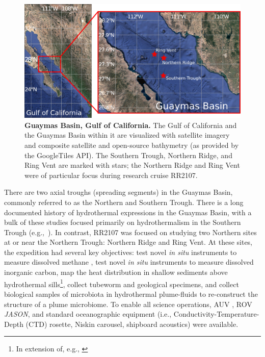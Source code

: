 \begin{figure}[!ht]
  \centering
  \includegraphics[width=\columnwidth]{figures/ops_guaymas.png}
  \caption[Guaymas Basin, Gulf of California.]{\textbf{Guaymas Basin, Gulf of California.} The Gulf of California and the Guaymas Basin within it are visualized with satellite imagery and composite satellite and open-source bathymetry (as provided by the GoogleTiles API). The Southern Trough, Northern Ridge, and Ring Vent are marked with stars; the Northern Ridge and Ring Vent were of particular focus during research cruise RR2107.}
  \label{fig:ops_map}
\end{figure}

There are two axial troughs (spreading segments) in the Guaymas Basin, commonly referred to as the Northern and Southern Trough. There is a long documented history of hydrothermal expressions in the Guaymas Basin, with a bulk of these studies focused primarily on hydrothermalism in the Southern Trough (e.g.,~\cite{ondreas2018recent, teske2016guaymas, seewald1994variations, von1985chemistry, lonsdale1985hydrothermal}). In contrast, RR2107 was focused on studying two Northern sites at or near the Northern Trough: Northern Ridge and Ring Vent. At these sites, the expedition had several key objectives: test novel \emph{in situ} instruments to measure dissolved methane \autocite{kapit2021dissolved,kapit2021measurement,michel2022gas}, test novel \emph{in situ} instruments to measure dissolved inorganic carbon, map the heat distribution in shallow sediments above hydrothermal sills\footnote{In extension of, e.g., \cite{neumann2022heat}}, collect tubeworm and geological specimens, and collect biological samples of microbiota in hydrothermal plume-fluids to re-construct the structure of a plume microbiome. To enable all science operations, AUV \Sentry, ROV \emph{JASON}, and standard oceanographic equipment (i.e., Conductivity-Temperature-Depth (CTD) rosette, Niskin carousel, shipboard acoustics) were available.


